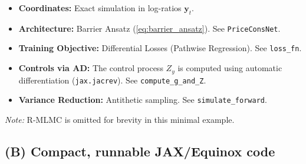 \documentclass[11pt,letterpaper,oneside]{article}
\numberwithin{equation}{section}
\newcommand{\1}{\mathbf{1}}
\begin{document}
\begin{tcolorbox}[didacticstyle]
\begin{tcolorbox}[mathstyle,title={Three-Tree Parameters}]
\begin{tcolorbox}[didacticstyle,title={Computational Strategy Applied}]
  \begin{itemize}[leftmargin=1.25em]
    \item \textbf{Coordinates:} Exact simulation in log-ratios $\bm{y}_t$.
    \item \textbf{Architecture:} Barrier Ansatz (\cref{eq:barrier_ansatz}). See \texttt{PriceConsNet}.
    \item \textbf{Training Objective:} Differential Losses (Pathwise Regression). See \texttt{loss\_fn}.
    \item \textbf{Controls via AD:} The control process $Z_y$ is computed using automatic differentiation (\texttt{jax.jacrev}). See \texttt{compute\_g\_and\_Z}.
  \item \textbf{Variance Reduction:} Antithetic sampling. See \texttt{simulate\_forward}.
\end{itemize}

  	\textit{Note:} R-MLMC is omitted for brevity in this minimal example.

\end{tcolorbox} %
\end{tcolorbox} %
\end{tcolorbox} %

\subsection{(B) Compact, runnable JAX/Equinox code}
\end{document}

